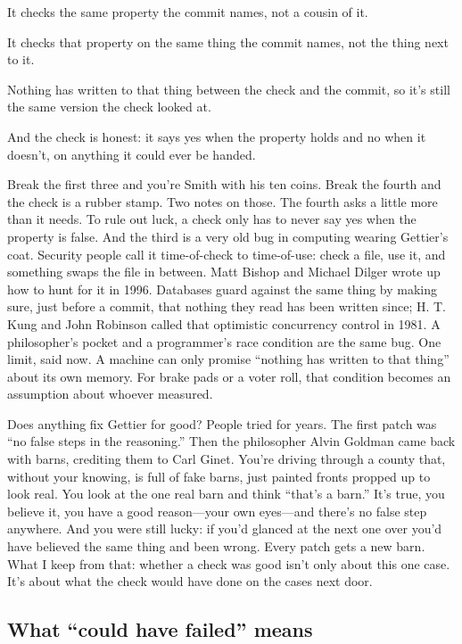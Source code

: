 \documentclass[11pt,twoside]{article}
\theoremstyle{thielethm}
\theoremstyle{thieledef}
\theoremstyle{thieledef}
\theoremstyle{thieledef}
\theoremstyle{thielethm}
\theoremstyle{thieleobs}
\theoremstyle{thielethm}
\begin{document}
It checks the same property the commit names, not a cousin of it.

It checks that property on the same thing the commit names, not the thing next to it.

Nothing has written to that thing between the check and the commit, so it's still the same version the check looked at.

And the check is honest: it says yes when the property holds and no when it doesn't, on anything it could ever be handed.

Break the first three and you're Smith with his ten coins. Break the fourth and the check is a rubber stamp. Two notes on those. The fourth asks a little more than it needs. To rule out luck, a check only has to never say yes when the property is false. And the third is a very old bug in computing wearing Gettier's coat. Security people call it time-of-check to time-of-use: check a file, use it, and something swaps the file in between. Matt Bishop and Michael Dilger wrote up how to hunt for it in 1996. Databases guard against the same thing by making sure, just before a commit, that nothing they read has been written since; H. T. Kung and John Robinson called that optimistic concurrency control in 1981. A philosopher's pocket and a programmer's race condition are the same bug. One limit, said now. A machine can only promise ``nothing has written to that thing'' about its own memory. For brake pads or a voter roll, that condition becomes an assumption about whoever measured.

Does anything fix Gettier for good? People tried for years. The first patch was ``no false steps in the reasoning.'' Then the philosopher Alvin Goldman came back with barns, crediting them to Carl Ginet. You're driving through a county that, without your knowing, is full of fake barns, just painted fronts propped up to look real. You look at the one real barn and think ``that's a barn.'' It's true, you believe it, you have a good reason---your own eyes---and there's no false step anywhere. And you were still lucky: if you'd glanced at the next one over you'd have believed the same thing and been wrong. Every patch gets a new barn. What I keep from that: whether a check was good isn't only about this one case. It's about what the check would have done on the cases next door.

\subsection{What ``could have failed'' means}
\end{document}
